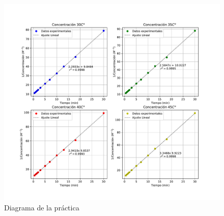 \documentclass[12pt,letterpaper]{article}
\begin{document}
\begin{figure}[H]
    \centering
    \includegraphics[scale=0.65]{Figuras/Ctodos.pdf}
    \caption{Diagrama de la pr\'{a}ctica}
\end{figure}













\end{document}
